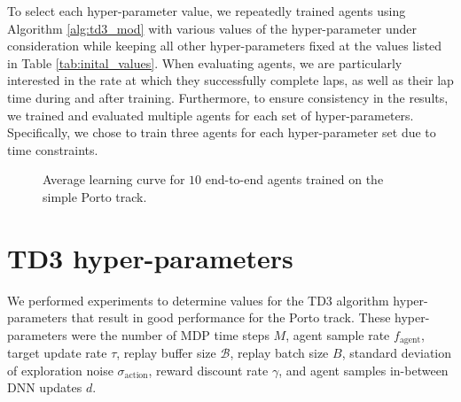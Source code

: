 

To select each hyper-parameter value, we repeatedly trained agents using Algorithm \ref{alg:td3_mod} with 
various values of the hyper-parameter under consideration while keeping all other hyper-parameters fixed at the values listed in Table \ref{tab:inital_values}. 
When evaluating agents, we are particularly interested in the rate at which they successfully complete laps, as well as their lap time during and after training.
Furthermore, to ensure consistency in the results, we trained and evaluated multiple agents for each set of hyper-parameters. 
Specifically, we chose to train three agents for each hyper-parameter set due to time constraints.



%     

\begin{figure}[htb!]
    \centering
    
    \caption[Learning curve for end-to-end agents]{Average learning curve for $10$ end-to-end agents trained on the simple Porto track.}
    \label{fig:MDP_steps_learning_curve}
\end{figure}



\section{TD3 hyper-parameters}\label{sec:algorithm_selection}


We performed experiments to determine values for the TD3 algorithm hyper-parameters that result in good performance for the Porto track.
These hyper-parameters were the number of MDP time steps $M$, agent sample rate $f_{\text{agent}}$, target update rate $\tau$, replay buffer size $\mathcal{B}$, replay batch size $B$, standard deviation of exploration noise $\sigma_{\text{action}}$, reward discount rate $\gamma$, and agent samples in-between DNN updates $d$.


